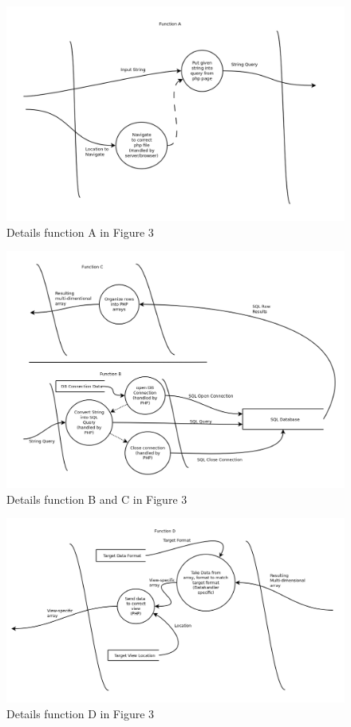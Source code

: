 \documentclass[11pt]{article}
\begin{document}
\begin{figure}[h]
  \centering
  \includegraphics[width=.75\textwidth]{diagrams/FunctionA.png}
  \caption{Details function A in Figure 3}
\end{figure}

\begin{figure}[h]
  \centering
  \includegraphics[width=.75\textwidth]{diagrams/FunctionsB&C.png}
  \caption{Details function B and C in Figure 3}
\end{figure}

\begin{figure}[h]
  \centering
  \includegraphics[width=.75\textwidth]{diagrams/FunctionD.png}
  \caption{Details function D in Figure 3}
\end{figure}
\end{document}

